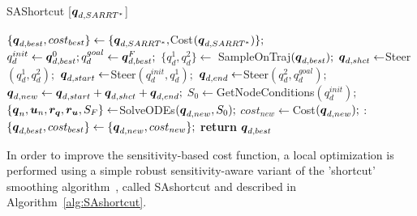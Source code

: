 \begin{algorithm}[htp]
    \caption{SAShortcut [$\boldsymbol{q}_{d,SARRT^*}$]}\label{alg:SAshortcut}
    \begin{algorithmic}[1]
        \State $\{\boldsymbol{q}_{d,best}, cost_{best}\} \gets \{\boldsymbol{q}_{d,SARRT^*}, $Cost$(\boldsymbol{q}_{d,SARRT^*}) \};$
        \State $q_d^{init} \gets \boldsymbol{q}_{d,best}^0; q_d^{goal} \gets \boldsymbol{q}_{d,best}^F;$
            \State $\{q_d^{1}, q_d^{2}\} \gets$ SampleOnTraj$(\boldsymbol{q}_{d,best});$
            \State $\boldsymbol{q}_{d,shct} \gets $Steer$(q_d^{1}, q_d^{2});$
                \State $\boldsymbol{q}_{d,start} \gets $Steer$(q_d^{init}, q_d^{1});$
                \State $\boldsymbol{q}_{d,end} \gets $Steer$(q_d^{2}, q_d^{goal});$
                \State $\boldsymbol{q}_{d,new} \gets \boldsymbol{q}_{d,start}+\boldsymbol{q}_{d,shct}+\boldsymbol{q}_{d,end};$
                \State $S_0 \gets $GetNodeConditions$(q_d^{init});$
                \State $\{\boldsymbol{q}_n, \boldsymbol{u}_n, \boldsymbol{r_q}, \boldsymbol{r_u}, S_F\}  \gets $SolveODEs$(\boldsymbol{q}_{d,new}, S_0);$
                \State $cost_{new} \gets $Cost$(\boldsymbol{q}_{d,new});$
                :   
                        \State $\{\boldsymbol{q}_{d,best}, cost_{best}\} \gets \{\boldsymbol{q}_{d,new}, cost_{new}\};$
                    \EndIf
                \EndIf
            \EndIf
        \EndWhile
    \State \textbf{return} $\boldsymbol{q}_{d,best}$
    \end{algorithmic}
\end{algorithm}

In order to improve the sensitivity-based cost function, a local optimization is performed using a simple robust sensitivity-aware variant of the 'shortcut' smoothing algorithm~\cite{cShortcut}, called \gls{SAshortcut} and described in Algorithm~\ref{alg:SAshortcut}. 

